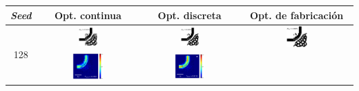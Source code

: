 \begin{table}[ht]
    \centering
    \vspace*{-2.5cm}
    \hspace*{-3cm}
    \begin{tabular}{|c|c|c|c|}
    \hline 
    \emph{Seed} & Opt. continua & Opt. discreta &  Opt. de fabricación \\
    \hline
      \multirow{2}{*}{128} &
      \includegraphics[width=0.20\textwidth]{image/results/bend/GA/visualize_eps_cont_128.png} &
      \includegraphics[width=0.20\textwidth]{image/results/bend/GA/visualize_eps_disc_128.png} &
      \includegraphics[width=0.20\textwidth]{image/results/bend/GA/visualize_eps_fab_128.png} \\
      \cline{2-4}
      &
      \includegraphics[width=0.33\textwidth]{image/results/bend/GA/visualize_field_cont_128.png} &
      \includegraphics[width=0.33\textwidth]{image/results/bend/GA/visualize_field_disc_128.png} &

\end{tabular}
\end{table}
